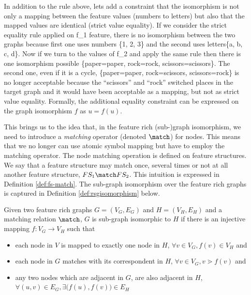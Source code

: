 In addition to the rule above, lets add a constraint that the isomorphism is not only a mapping between the feature values (numbers to letters) but also that the mapped values are identical (strict value equality). 
If we consider the strict equality rule applied on f_1 feature, there is no isomorphism between the two graphs because first one uses numbers  \{1, 2, 3\} and the second uses letters\{a, b, c, d\}. Now if we turn to the values of f_2 and apply the same rule then there is one isomorphism possible \{paper=paper, rock=rock, scissors=scissors\}. The second one, even if it is a cycle, \{paper=paper, rock=scissors, scissors=rock\} is no longer acceptable because the ``scissors'' and ``rock'' switched places in the target graph and it would have been acceptable as a mapping, but not as strict value equality. Formally, the additional equality constraint can be expressed on the graph isomorphism $f$ as $u=f(u)$.

This brings us to the idea that, in the feature rich (sub-)graph isomorphism, we need to introduce a \textit{matching} operator (denoted $\match$) for nodes. This means that we no longer can use atomic symbol mapping but have to employ the matching operator. The node matching operation is defined on feature structures. We say that a feature structure may match once, several times or not at all another feature structure, $FS_1 \match FS_2$. This intuition is expressed in Definition \ref{def:fs-match}. The sub-graph isomorphism over the feature rich graphs is captured in Definition \ref{def:rsgisomorphism} below.

 

\begin{definition}\label{def:rsgisomorphism}
    Given two feature rich graphs $G=(V_G,E_G)$ and $H=(V_H,E_H)$ and a matching relation $\match$, $G$ is sub-graph isomorphic to $H$ if there is an injective mapping $f:V_G \rightarrow V_H$ such that
    \begin{itemize}
        \item each node in $V$ is mapped to exactly one node in $H$, $\forall v \in V_G, f(v) \in V_H$ and
        \item each node in $G$ matches with its correspondent in $H$, $\forall v \in V_G, v \gtrdot f(v)$ and
        \item any two nodes which are adjacent in $G$, are also adjacent in $H$, $\forall (u,v) \in E_G, \exists \big(f(u), f(v)\big) \in E_H $
    \end{itemize}
\end{definition}

